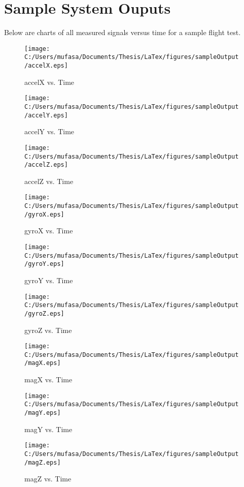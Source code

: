 \chapter{Sample System Ouputs}
Below are charts of all measured signals versus time for a sample flight test.
\begin{figure}[]
	\centering
	\caption{accelX vs. Time}
		\texttt{[image: C:/Users/mufasa/Documents/Thesis/LaTex/figures/sampleOutput/accelX.eps]}
\end{figure}
\begin{figure}[]
	\centering
	\caption{accelY vs. Time}
		\texttt{[image: C:/Users/mufasa/Documents/Thesis/LaTex/figures/sampleOutput/accelY.eps]}
\end{figure}
\begin{figure}[]
	\centering
	\caption{accelZ vs. Time}
		\texttt{[image: C:/Users/mufasa/Documents/Thesis/LaTex/figures/sampleOutput/accelZ.eps]}
\end{figure}
\begin{figure}[]
	\centering
	\caption{gyroX vs. Time}
		\texttt{[image: C:/Users/mufasa/Documents/Thesis/LaTex/figures/sampleOutput/gyroX.eps]}
\end{figure}
\begin{figure}[]
	\centering
	\caption{gyroY vs. Time}
		\texttt{[image: C:/Users/mufasa/Documents/Thesis/LaTex/figures/sampleOutput/gyroY.eps]}
\end{figure}
\begin{figure}[]
	\centering
	\caption{gyroZ vs. Time}
		\texttt{[image: C:/Users/mufasa/Documents/Thesis/LaTex/figures/sampleOutput/gyroZ.eps]}
\end{figure}
\begin{figure}[]
	\centering
	\caption{magX vs. Time}
		\texttt{[image: C:/Users/mufasa/Documents/Thesis/LaTex/figures/sampleOutput/magX.eps]}
\end{figure}
\begin{figure}[]
	\centering
	\caption{magY vs. Time}
		\texttt{[image: C:/Users/mufasa/Documents/Thesis/LaTex/figures/sampleOutput/magY.eps]}
\end{figure}
\begin{figure}[]
	\centering
	\caption{magZ vs. Time}
		\texttt{[image: C:/Users/mufasa/Documents/Thesis/LaTex/figures/sampleOutput/magZ.eps]}
\end{figure}
